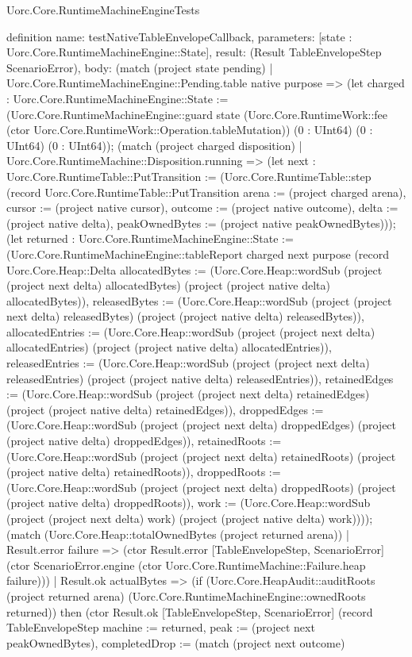 \begin{lexlean}{Uorc.Core.RuntimeMachineEngineTests}
\begin{semanticmodule}
definition{
  name: testNativeTableEnvelopeCallback,
  parameters: [state : Uorc.Core.RuntimeMachineEngine::State],
  result: (Result TableEnvelopeStep ScenarioError),
  body: (match (project state pending)
    | Uorc.Core.RuntimeMachineEngine::Pending.table native purpose => (let charged : Uorc.Core.RuntimeMachineEngine::State := (Uorc.Core.RuntimeMachineEngine::guard state (Uorc.Core.RuntimeWork::fee (ctor Uorc.Core.RuntimeWork::Operation.tableMutation)) (0 : UInt64) (0 : UInt64) (0 : UInt64)); (match (project charged disposition)
      | Uorc.Core.RuntimeMachine::Disposition.running => (let next : Uorc.Core.RuntimeTable::PutTransition := (Uorc.Core.RuntimeTable::step (record Uorc.Core.RuntimeTable::PutTransition {arena := (project charged arena), cursor := (project native cursor), outcome := (project native outcome), delta := (project native delta), peakOwnedBytes := (project native peakOwnedBytes)})); (let returned : Uorc.Core.RuntimeMachineEngine::State := (Uorc.Core.RuntimeMachineEngine::tableReport charged next purpose (record Uorc.Core.Heap::Delta {allocatedBytes := (Uorc.Core.Heap::wordSub (project (project next delta) allocatedBytes) (project (project native delta) allocatedBytes)), releasedBytes := (Uorc.Core.Heap::wordSub (project (project next delta) releasedBytes) (project (project native delta) releasedBytes)), allocatedEntries := (Uorc.Core.Heap::wordSub (project (project next delta) allocatedEntries) (project (project native delta) allocatedEntries)), releasedEntries := (Uorc.Core.Heap::wordSub (project (project next delta) releasedEntries) (project (project native delta) releasedEntries)), retainedEdges := (Uorc.Core.Heap::wordSub (project (project next delta) retainedEdges) (project (project native delta) retainedEdges)), droppedEdges := (Uorc.Core.Heap::wordSub (project (project next delta) droppedEdges) (project (project native delta) droppedEdges)), retainedRoots := (Uorc.Core.Heap::wordSub (project (project next delta) retainedRoots) (project (project native delta) retainedRoots)), droppedRoots := (Uorc.Core.Heap::wordSub (project (project next delta) droppedRoots) (project (project native delta) droppedRoots)), work := (Uorc.Core.Heap::wordSub (project (project next delta) work) (project (project native delta) work))})); (match (Uorc.Core.Heap::totalOwnedBytes (project returned arena))
        | Result.error failure => (ctor Result.error [TableEnvelopeStep, ScenarioError] (ctor ScenarioError.engine (ctor Uorc.Core.RuntimeMachine::Failure.heap failure)))
        | Result.ok actualBytes => (if (Uorc.Core.HeapAudit::auditRoots (project returned arena) (Uorc.Core.RuntimeMachineEngine::ownedRoots returned)) then (ctor Result.ok [TableEnvelopeStep, ScenarioError] (record TableEnvelopeStep {machine := returned, peak := (project next peakOwnedBytes), completedDrop := (match (project next outcome)
}}
\end{semanticmodule}
\end{lexlean}
